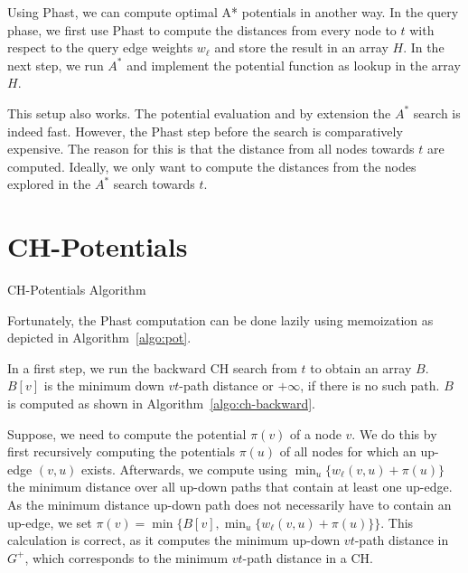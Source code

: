 \documentclass[a4paper,UKenglish,cleveref, autoref]{lipics-v2019}
\begin{document}
Using Phast, we can compute optimal A* potentials in another way.
In the query phase, we first use Phast to compute the distances from every node to $t$ with respect to the query edge weights $w_\ell$ and store the result in an array $H$.
In the next step, we run $A^*$ and implement the potential function as lookup in the array $H$.

This setup also works.
The potential evaluation and by extension the $A^*$ search is indeed fast.
However, the Phast step before the search is comparatively expensive.
The reason for this is that the distance from all nodes towards $t$ are computed.
Ideally, we only want to compute the distances from the nodes explored in the $A^*$ search towards $t$.

\section{CH-Potentials}

\begin{algorithm2e}
\caption{CH-Potentials Algorithm}
\label{algo:pot}
\end{algorithm2e}

Fortunately, the Phast computation can be done lazily using memoization as depicted in Algorithm~\ref{algo:pot}.

In a first step, we run the backward CH search from $t$ to obtain an array $B$.
$B[v]$ is the minimum down $vt$-path distance or $+\infty$, if there is no such path.
$B$ is computed as shown in Algorithm~\ref{algo:ch-backward}.

Suppose, we need to compute the potential $\pi(v)$ of a node $v$.
We do this by first recursively computing the potentials $\pi(u)$ of all nodes for which an up-edge $(v,u)$ exists.
Afterwards, we compute using $\min_u\{w_\ell(v,u) + \pi(u)\}$ the minimum distance over all up-down paths that contain at least one up-edge.
As the minimum distance up-down path does not necessarily have to contain an up-edge, we set $\pi(v) = \min \{ B[v], \min_u\{w_\ell(v,u) + \pi(u)\} \}$.
This calculation is correct, as it computes the minimum up-down $vt$-path distance in $G^+$, which corresponds to the minimum $vt$-path distance in a CH.
\end{document}

